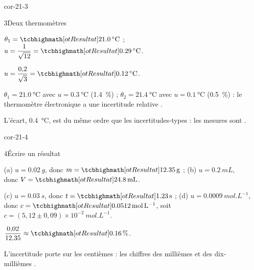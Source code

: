 \begin{blocLivre}{cor-21-3}
\begin{corrige}{3}{Deux thermomètres}
\begin{questions}
\item $\theta_1=\res{\qty{21,0}{\degreeCelsius}}$ ; $u=\dfrac{1}{\sqrt{12}}=\res{\qty{0,29}{\degreeCelsius}}$.
\item $u=\dfrac{0{,}2}{\sqrt{3}}=\res{\qty{0,12}{\degreeCelsius}}$.
\item $\theta_1=\qty{21,0}{\degreeCelsius}$ avec $u=\qty{0,3}{\degreeCelsius}$ (\qty{1,4}{\percent}) ; $\theta_2=\qty{21,4}{\degreeCelsius}$ avec $u=\qty{0,1}{\degreeCelsius}$ (\qty{0,5}{\percent}) : le
thermomètre électronique a une incertitude relative .
\item L'écart, \qty{0,4}{\degreeCelsius}, est du même ordre que les incertitudes-types : les mesures sont .
\end{questions}
\end{corrige}
\end{blocLivre}
\begin{blocLivre}{cor-21-4}
\begin{corrige}{4}{Écrire un résultat}
\begin{questions}
\item (a) $u=\qty{0,02}{g}$, donc $m=\res{\qty{12,35}{g}}$ ; (b) $u=\qty{0,2}{mL}$, donc $V=\res{\qty{24,8}{mL}}$.
\item (c) $u=\qty{0,03}{s}$, donc $t=\res{\qty{1,23}{s}}$ ; (d) $u=\qty{0,0009}{mol.L^{-1}}$, donc $c=\res{\qty{0,0512}{mol.L^{-1}}}$, soit
$c=(5{,}12\pm0{,}09)\times10^{-2}~\unit{mol.L^{-1}}$.
\item $\dfrac{0{,}02}{12{,}35}\approx\res{\qty{0,16}{\percent}}$.
\item L'incertitude porte sur les centièmes : les chiffres des millièmes et des dix-millièmes .
\end{questions}
\end{corrige}
\end{blocLivre}
